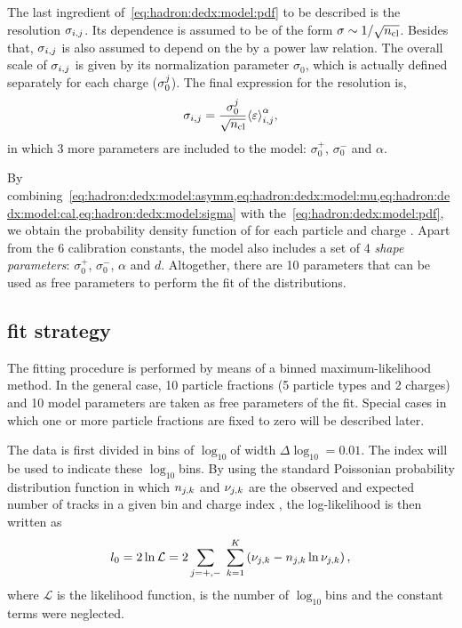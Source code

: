 The last ingredient of~\cref{eq:hadron:dedx:model:pdf}
to be described is the resolution $\sigma_{i,j}$. 
Its \ncl dependence is assumed to be of the form
$\sigma \sim 1/\sqrt{\mbox{$n_{\text{cl}}$}}$. Besides that, $\sigma_{i,j}$
is also assumed to depend on the \meaneps by a power law relation.
The overall scale of $\sigma_{i,j}$ is given by its normalization
parameter $\sigma_0$, which is actually defined separately for each charge ($\sigma_0^{j}$).
The final expression for the resolution is,
\begin{equation}
  \sigma_{i,j} = \frac{\sigma_0^{j}}{\sqrt{\mbox{$n_{\text{cl}}$}}} \mbox{$\langle\varepsilon\rangle$}_{i,j}^{\alpha},
  \label{eq:hadron:dedx:model:sigma}
\end{equation}
in which 3 more parameters are included to the model: $\sigma_0^+$, $\sigma_0^-$ and $\alpha$. 

By combining~\cref{eq:hadron:dedx:model:asymm,eq:hadron:dedx:model:mu,eq:hadron:dedx:model:cal,eq:hadron:dedx:model:sigma}
with the~\cref{eq:hadron:dedx:model:pdf}, we obtain the probability density
function of \eps for each particle \ipart and charge \ich.
Apart from the 6 calibration constants,
the model also includes a set of 4 \textit{shape parameters}: $\sigma_0^+$, $\sigma_0^-$, $\alpha$ and $d$.
Altogether, there are 10 parameters that can be used as free parameters
to perform the fit of the \eps distributions.


\subsection{\boldmath \dedx fit strategy}
\label{sec:hadron:dedx:fit}

The fitting procedure is performed by means of a binned maximum-likelihood method.
In the general case, 10 particle fractions (5 particle types and 2 charges) and
10 model parameters are taken as free parameters of the fit. Special cases
in which one or more particle fractions are fixed to zero will be described later.

The \eps data is first divided in bins of $\log_{10}$\eps of width $\Delta\log_{10}$\eps$=0.01$.
The index \ieps will be used to indicate these $\log_{10}$\eps bins.
By using the standard Poissonian probability distribution function in which
$n_{j,k}$ and $\nu_{j,k}$ are the observed and expected
number of tracks in a given bin \ieps and charge index \ich,
the log-likelihood is then written as
\begin{equation}
  l_0 = 2\ln \mathcal{L} = 2\sum_{j=+,-}\;\sum_{k=1}^{K} \left(\nu_{j,k} - n_{j,k}\ln\nu_{j,k}\right), 
  \label{eq:hadron:dedx:fit:l0}
\end{equation}
where $\mathcal{L}$ is the likelihood function, \neps is the number of $\log_{10}$\eps bins and the constant terms were neglected.

